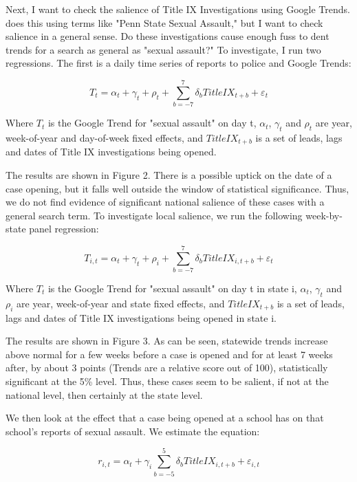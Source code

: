 \documentclass[AER,draftmode]{AEA}
\begin{document}
Next, I want to check the salience of Title IX Investigations using Google Trends.  does this using terms like "Penn State Sexual Assault," but I want to check salience in a general sense. Do these investigations cause enough fuss to dent trends for a search as general as "sexual assault?" To investigate, I run two regressions. The first is a daily time series of reports to police and Google Trends:

$$
T_{t} = \alpha_{t} + \gamma_{t} + \rho_{t} + \sum_{b=-7}^{7} \delta_{b} TitleIX_{t+b} + \varepsilon_{t}
$$

Where $T_{t}$ is the Google Trend for "sexual assault" on day t, $\alpha_{t}$, $\gamma_{t}$ and $\rho_{t}$ are year, week-of-year and day-of-week fixed effects, and $TitleIX_{t+b}$ is a set of leads, lags and dates of Title IX investigations being opened. 

The results are shown in Figure 2. There is a possible uptick on the date of a case opening, but it falls well outside the window of statistical significance. Thus, we do not find evidence of significant national salience of these cases with a general search term. To investigate local salience, we run the following week-by-state panel regression: 

$$
T_{i,t} = \alpha_{t} + \gamma_{t} + \rho_{i} + \sum_{b=-7}^{7} \delta_{b} TitleIX_{i,t+b} + \varepsilon_{t}
$$

Where $T_{t}$ is the Google Trend for "sexual assault" on day t in state i, $\alpha_{t}$, $\gamma_{t}$ and $\rho_{i}$ are year, week-of-year and state fixed effects, and $TitleIX_{t+b}$ is a set of leads, lags and dates of Title IX investigations being opened in state i. 

The results are shown in Figure 3. As can be seen, statewide trends increase above normal for a few weeks before a case is opened and for at least 7 weeks after, by about 3 points (Trends are a relative score out of 100), statistically significant at the 5\% level. Thus, these cases seem to be salient, if not at the national level, then certainly at the state level.

We then look at the effect that a case being opened at a school has on that school's reports of sexual assault. We estimate the equation:

$$
r_{i,t} = \alpha_{t} + \gamma_{i} \sum_{b=-5}^{5} \delta_{b} TitleIX_{i,t+b} + \varepsilon_{i,t}
$$
\end{document}
